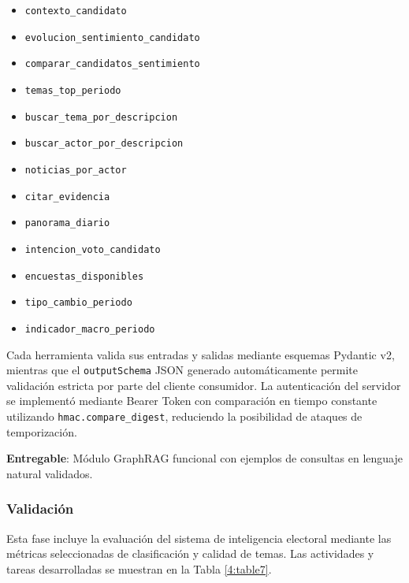 \begin{itemize}
    \item \texttt{contexto\_candidato}
    \item \texttt{evolucion\_sentimiento\_candidato}
    \item \texttt{comparar\_candidatos\_sentimiento}
    \item \texttt{temas\_top\_periodo}
    \item \texttt{buscar\_tema\_por\_descripcion}
    \item \texttt{buscar\_actor\_por\_descripcion}
    \item \texttt{noticias\_por\_actor}
    \item \texttt{citar\_evidencia}
    \item \texttt{panorama\_diario}
    \item \texttt{intencion\_voto\_candidato}
    \item \texttt{encuestas\_disponibles}
    \item \texttt{tipo\_cambio\_periodo}
    \item \texttt{indicador\_macro\_periodo}
\end{itemize}

Cada herramienta valida sus entradas y salidas mediante esquemas Pydantic v2, mientras que el \texttt{outputSchema} JSON generado automáticamente permite validación estricta por parte del cliente consumidor. La autenticación del servidor se implementó mediante Bearer Token con comparación en tiempo constante utilizando \texttt{hmac.compare\_digest}, reduciendo la posibilidad de ataques de temporización.
 
\textbf{Entregable}: Módulo GraphRAG funcional con ejemplos de consultas en lenguaje natural validados.
 
\subsubsection{Validación}
 
Esta fase incluye la evaluación del sistema de inteligencia electoral mediante las métricas seleccionadas de clasificación y calidad de temas. Las actividades y tareas desarrolladas se muestran en la Tabla \ref{4:table7}.

